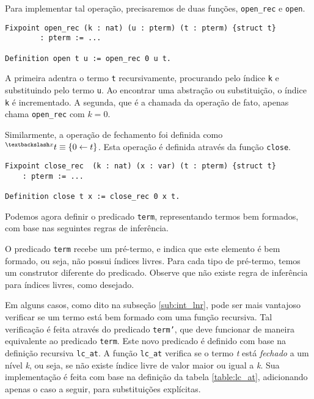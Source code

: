 Para implementar tal operação, precisaremos de duas funções, \texttt{open\_rec}
e \texttt{open}.

\begin{lstlisting}[basicstyle=\small]
Fixpoint open_rec (k : nat) (u : pterm) (t : pterm) {struct t} 
        : pterm := ...

Definition open t u := open_rec 0 u t.
\end{lstlisting}

A primeira adentra o termo \texttt{t} recursivamente, procurando pelo índice
\texttt{k} e substituindo pelo termo \texttt{u}. Ao encontrar uma abstração ou
substituição, o índice \texttt{k} é incrementado.  A segunda, que é a chamada da
operação de fato, apenas chama \texttt{open\_rec} com $k = 0$.

Similarmente, a operação de fechamento foi definida como $ ^{\textbackslash x}t
\equiv \{0 \leftarrow t\}$. Esta operação é definida através da função
\texttt{close}.

\begin{lstlisting}[basicstyle=\small]
Fixpoint close_rec  (k : nat) (x : var) (t : pterm) {struct t} 
    : pterm := ...

Definition close t x := close_rec 0 x t.
\end{lstlisting}

Podemos agora definir o predicado \texttt{term}, representando termos bem
formados, com base nas seguintes regras de inferência.


O predicado \texttt{term} recebe um pré-termo, e indica que este elemento é bem
formado, ou seja, não possui índices livres. Para cada tipo de pré-termo, temos
um construtor diferente do predicado. Observe que não existe regra de inferência
para índices livres, como desejado.

Em alguns casos, como dito na subseção \ref{sub:int_lnr}, pode ser mais
vantajoso verificar se um termo está bem formado com uma função recursiva.
Tal verificação é feita através do predicado \texttt{term'}, que deve funcionar de
maneira equivalente ao predicado \texttt{term}. Este novo predicado é definido
com base na definição recursiva \texttt{lc\_at}. A função \texttt{lc\_at}
verifica se o termo \emph{t} está \textit{fechado} a um nível \emph{k}, ou seja,
se não existe índice livre de valor maior ou igual a \emph{k}. Sua implementação
é feita com base na definição da tabela \ref{table:lc_at}, adicionando apenas o
caso a seguir, para substituições explícitas.


